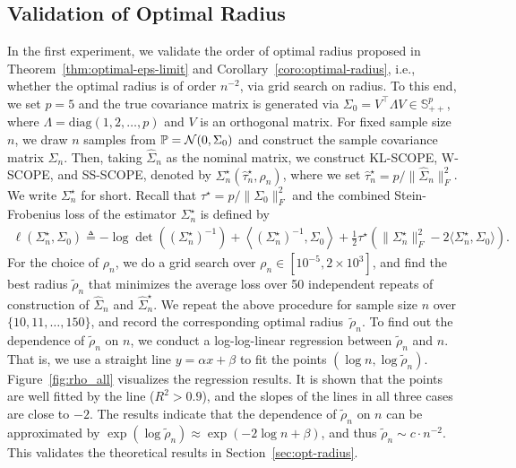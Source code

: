\documentclass[11pt]{article}
\def\S{\mathbb{S}}
\def\la{\langle}
\def\ra{\rangle}
\newcommand{\opt}{^\star}
\newcommand{\Let}{\triangleq}
\def\diag{\mathrm{diag}}
\def\transpose{\top}
\def\S{\mathbb{S}}
\def\la{\langle}
\def\PD{{\S^p_{++}}}
\def\ra{\rangle}
\newcommand{\wh}{\widehat}
\begin{document}
\subsection{Validation of Optimal Radius}\label{sec:exp-0}
In the first experiment, we validate the order of optimal radius proposed in Theorem~\ref{thm:optimal-eps-limit} and Corollary~\ref{coro:optimal-radius}, i.e., whether the optimal radius is of order $n^{-2}$, via grid search on radius. To this end, we set $p=5$ and the true covariance matrix is generated via $\Sigma_0=V^\transpose \Lambda V \in \PD$, where $\Lambda=\diag(1,2,\ldots,p)$ and $V$ is an orthogonal matrix. For fixed sample size $n$, we draw $n$ samples from $\mathbb{P}={\cal N}(0,\Sigma_0)$ and construct the sample covariance matrix $\wh\Sigma_n$. Then, taking $\wh\Sigma_n$ as the nominal matrix, we construct KL-SCOPE, W-SCOPE, and SS-SCOPE, denoted by $\Sigma_n\opt(\wh\tau_n\opt, \rho_n)$, where we set $\wh\tau_n\opt=p/\|\wh\Sigma_n\|_F^2$. We write $\Sigma_n\opt$ for short. Recall that $\tau\opt=p/\|\Sigma_0\|_F^2$ and the combined Stein-Frobenius loss of the estimator $\Sigma_n\opt$ is defined by
\begin{align}\label{eq:exp-loss}
    \ell(\Sigma_n\opt,\Sigma_0) \Let -\log\det\left((\Sigma_n\opt)^{-1}\right) + \left\la (\Sigma_n\opt)^{-1}, \Sigma_0\right\ra + \frac{1}{2}\tau\opt\left(\|\Sigma_n\opt\|_F^2-2\la\Sigma_n\opt,\Sigma_0\ra\right).
\end{align}
For the choice of $\rho_n$, we do a grid search over $\rho_n\in [10^{-5}, 2\times 10^3]$, and find the best radius $\widetilde{\rho}_n$ that minimizes the average loss over 50 independent repeats of construction of $\wh\Sigma_n$ and $\wh\Sigma_n\opt$. We repeat the above procedure for sample size $n$ over $\{10,11,\ldots,150\}$, and record the corresponding optimal radius~$\widetilde{\rho}_n$. To find out the dependence of $\widetilde{\rho}_n$ on $n$, we conduct a log-log-linear regression between $\widetilde{\rho}_n$ and $n$. That is, we use a straight line $y = \alpha x + \beta$ to fit the points $(\log n, \log \widetilde{\rho}_n)$. 
Figure~\ref{fig:rho_all} visualizes the regression results. It is shown that the points are well fitted by the line ($R^2>0.9$), and the slopes of the lines in all three cases are close to $-2$. The results indicate that the dependence of $\widetilde{\rho}_n$ on $n$ can be approximated by $\exp{(\log \widetilde{\rho}_n)} \approx \exp{(-2 \log n +\beta)}$, and thus $\widetilde{\rho}_n \sim c\cdot n^{-2}$. This validates the theoretical results in Section~\ref{sec:opt-radius}.
\end{document}

